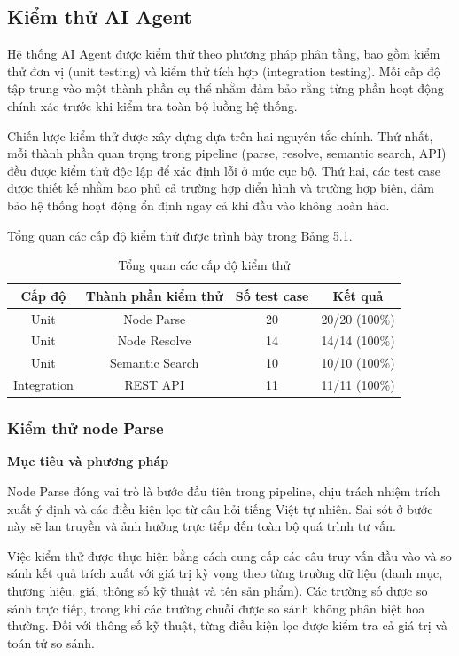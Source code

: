 \subsection{Kiểm thử AI Agent}

Hệ thống AI Agent được kiểm thử theo phương pháp phân tầng, bao gồm kiểm thử đơn vị (unit testing) và kiểm thử tích hợp (integration testing). Mỗi cấp độ tập trung vào một thành phần cụ thể nhằm đảm bảo rằng từng phần hoạt động chính xác trước khi kiểm tra toàn bộ luồng hệ thống.

Chiến lược kiểm thử được xây dựng dựa trên hai nguyên tắc chính. Thứ nhất, mỗi thành phần quan trọng trong pipeline (parse, resolve, semantic search, API) đều được kiểm thử độc lập để xác định lỗi ở mức cục bộ. Thứ hai, các test case được thiết kế nhằm bao phủ cả trường hợp điển hình và trường hợp biên, đảm bảo hệ thống hoạt động ổn định ngay cả khi đầu vào không hoàn hảo.

Tổng quan các cấp độ kiểm thử được trình bày trong Bảng 5.1.

\begin{table}[h]
\centering
\small
\begin{tabular}{|c|c|c|c|}
\hline
Cấp độ & Thành phần kiểm thử & Số test case & Kết quả \\
\hline
Unit & Node Parse & 20 & 20/20 (100\%) \\
Unit & Node Resolve & 14 & 14/14 (100\%) \\
Unit & Semantic Search & 10 & 10/10 (100\%) \\
Integration & REST API & 11 & 11/11 (100\%) \\
\hline
\end{tabular}
\caption{Tổng quan các cấp độ kiểm thử}
\end{table}

\subsubsection{Kiểm thử node Parse}

\textbf{Mục tiêu và phương pháp}

Node Parse đóng vai trò là bước đầu tiên trong pipeline, chịu trách nhiệm trích xuất ý định và các điều kiện lọc từ câu hỏi tiếng Việt tự nhiên. Sai sót ở bước này sẽ lan truyền và ảnh hưởng trực tiếp đến toàn bộ quá trình tư vấn.

Việc kiểm thử được thực hiện bằng cách cung cấp các câu truy vấn đầu vào và so sánh kết quả trích xuất với giá trị kỳ vọng theo từng trường dữ liệu (danh mục, thương hiệu, giá, thông số kỹ thuật và tên sản phẩm). Các trường số được so sánh trực tiếp, trong khi các trường chuỗi được so sánh không phân biệt hoa thường. Đối với thông số kỹ thuật, từng điều kiện lọc được kiểm tra cả giá trị và toán tử so sánh.

